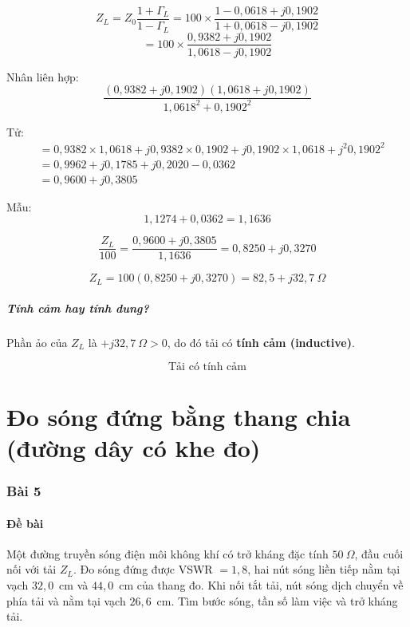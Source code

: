 \documentclass[12pt,a4paper]{article}
\begin{document}
\[
Z_L = Z_0 \frac{1 + \Gamma_L}{1 - \Gamma_L} = 100 \times \frac{1 - 0{,}0618 + j0{,}1902}{1 + 0{,}0618 - j0{,}1902}
\]
\[
= 100 \times \frac{0{,}9382 + j0{,}1902}{1{,}0618 - j0{,}1902}
\]

Nhân liên hợp:
\[
\frac{(0{,}9382 + j0{,}1902)(1{,}0618 + j0{,}1902)}{1{,}0618^2 + 0{,}1902^2}
\]

Tử:
\begin{align*}
&= 0{,}9382 \times 1{,}0618 + j0{,}9382 \times 0{,}1902 + j0{,}1902 \times 1{,}0618 + j^2 0{,}1902^2 \\
&= 0{,}9962 + j0{,}1785 + j0{,}2020 - 0{,}0362 \\
&= 0{,}9600 + j0{,}3805
\end{align*}

Mẫu:
\[
1{,}1274 + 0{,}0362 = 1{,}1636
\]

\[
\frac{Z_L}{100} = \frac{0{,}9600 + j0{,}3805}{1{,}1636} = 0{,}8250 + j0{,}3270
\]

\[
\boxed{Z_L = 100(0{,}8250 + j0{,}3270) = 82{,}5 + j32{,}7~\Omega}
\]

\subsubsection{Tính cảm hay tính dung?}

Phần ảo của $Z_L$ là $+j32{,}7~\Omega > 0$, do đó tải có \textbf{tính cảm (inductive)}.

\[
\boxed{\text{Tải có tính cảm}}
\]

\newpage
\part{Đo sóng đứng bằng thang chia (đường dây có khe đo)}

\section{Bài 5}

\subsection{Đề bài}
Một đường truyền sóng điện môi không khí có trở kháng đặc tính $50~\Omega$, đầu cuối nối với tải $Z_L$. Đo sóng đứng được VSWR $= 1{,}8$, hai nút sóng liền tiếp nằm tại vạch $32{,}0$~cm và $44{,}0$~cm của thang đo. Khi nối tắt tải, nút sóng dịch chuyển về phía tải và nằm tại vạch $26{,}6$~cm. Tìm bước sóng, tần số làm việc và trở kháng tải.
\end{document}
